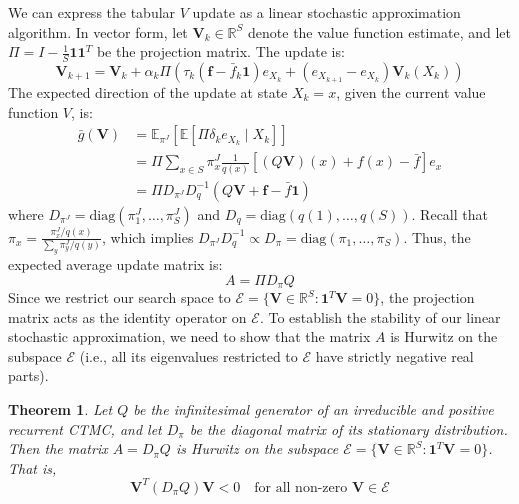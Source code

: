\documentclass[11pt]{article}
\newtheorem{theorem}{Theorem}
\begin{document}
We can express the tabular $V$ update as a linear stochastic approximation algorithm. In vector form, let $\mathbf{V}_k \in \mathbb{R}^S$ denote the value function estimate, and let $\Pi = I - \frac{1}{S} \mathbf{1}\mathbf{1}^T$ be the projection matrix. The update is:
\begin{equation}
    \mathbf{V}_{k+1} = \mathbf{V}_k + \alpha_k \Pi \left( \tau_k (\mathbf{f} - \bar{f}_k \mathbf{1}) e_{X_k} + (e_{X_{k+1}} - e_{X_k}) \mathbf{V}_k(X_k) \right)
\end{equation}
The expected direction of the update at state $X_k = x$, given the current value function $V$, is:
\begin{align}
    \bar{g}(\mathbf{V}) &= \mathbb{E}_{\pi^J} [ \mathbb{E} [ \Pi \delta_k e_{X_k} \mid X_k ] ] \nonumber \\
    &= \Pi \sum_{x \in S} \pi^J_x \frac{1}{q(x)} [ (Q \mathbf{V})(x) + f(x) - \bar{f} ] e_x \nonumber \\
    &= \Pi D_{\pi^J} D_q^{-1} (Q \mathbf{V} + \mathbf{f} - \bar{f} \mathbf{1})
\end{align}
where $D_{\pi^J} = \text{diag}(\pi^J_1, \dots, \pi^J_S)$ and $D_q = \text{diag}(q(1), \dots, q(S))$.
Recall that $\pi_x = \frac{\pi^J_x / q(x)}{\sum_y \pi^J_y / q(y)}$, which implies $D_{\pi^J} D_q^{-1} \propto D_\pi = \text{diag}(\pi_1, \dots, \pi_S)$. Thus, the expected average update matrix is:
\begin{equation}
    A = \Pi D_\pi Q
\end{equation}
Since we restrict our search space to $\mathcal{E} = \{ \mathbf{V} \in \mathbb{R}^S : \mathbf{1}^T \mathbf{V} = 0 \}$, the projection matrix acts as the identity operator on $\mathcal{E}$.
To establish the stability of our linear stochastic approximation, we need to show that the matrix $A$ is Hurwitz on the subspace $\mathcal{E}$ (i.e., all its eigenvalues restricted to $\mathcal{E}$ have strictly negative real parts).

\begin{theorem}
Let $Q$ be the infinitesimal generator of an irreducible and positive recurrent CTMC, and let $D_\pi$ be the diagonal matrix of its stationary distribution. Then the matrix $A = D_\pi Q$ is Hurwitz on the subspace $\mathcal{E} = \{ \mathbf{V} \in \mathbb{R}^S : \mathbf{1}^T \mathbf{V} = 0 \}$. That is,
\begin{equation}
    \mathbf{V}^T ( D_\pi Q ) \mathbf{V} < 0 \quad \text{for all non-zero } \mathbf{V} \in \mathcal{E}
\end{equation}
\end{theorem}
\end{document}
